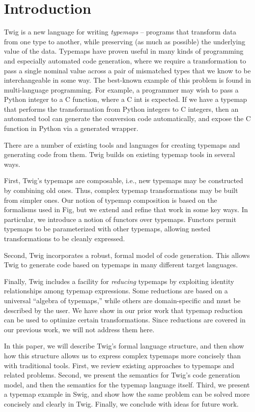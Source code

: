 
\section{Introduction}

Twig is a new language for writing \emph{typemaps} -- programs
that transform data from one type to another, while preserving (as
much as possible) the underlying value of the data. Typemaps have
proven useful in many kinds of programming and especially
automated code generation, where we require a transformation to
pass a single nominal value across a pair of mismatched types that
we know to be interchangeable in some way. The best-known example
of this problem is found in multi-language programming. For
example, a programmer may wish to pass a Python integer to a C
function, where a C int is expected. If we have a typemap that
performs the transformation from Python integers to C integers,
then an automated tool can generate the conversion code
automatically, and expose the C function in Python via a generated
wrapper.

There are a number of existing tools and languages for creating
typemaps and generating code from them. Twig builds on existing
typemap tools in several ways.

First, Twig's typemaps are composable, i.e., new typemaps may be
constructed by combining old ones. Thus, complex typemap
transformations may be built from simpler ones. Our notion of
typemap composition is based on the formalisms used in
Fig\cite{reppy:fig}, but we extend and refine that work in some
key ways. In particular, we introduce a notion of functors over
typemaps. Functors permit typemaps to be parameterized with other
typemaps, allowing nested transformations to be cleanly expressed.

Second, Twig incorporates a robust, formal model of code
generation. This allows Twig to generate code based on typemaps in
many different target languages.

Finally, Twig includes a facility for \emph{reducing} typemaps by
exploiting identity relationships among typemap expressions. Some
reductions are based on a universal ``algebra of typemaps,'' while
others are domain-specific and must be described by the user. We
have show in our prior work \cite{ourselves} that typemap
reduction can be used to optimize certain transformations. Since
reductions are covered in our previous work, we will not address
them here.

In this paper, we will describe Twig's formal language structure,
and then show how this structure allows us to express complex
typemaps more concisely than with traditional tools. First, we
review existing approaches to typemaps and related problems.
Second, we present the semantics for Twig's code generation model,
and then the semantics for the typemap language itself. Third, we
present a typemap example in Swig, and show how the same problem
can be solved more concisely and clearly in Twig. Finally, we
conclude with ideas for future work.
